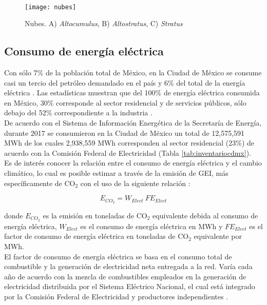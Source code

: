 \\

\begin{figure}[htb]
  \centering
    \texttt{[image: nubes]}
  \caption{Nubes. A) \textit{Altocumulus}, B) \textit{Altostratus}, C) \textit{Stratus} \citep{Metoffice2019}}
  \label{nubes}
\end{figure}

\newpage

\subsection{Consumo de energía eléctrica}
\label{subsec:consumoenergiaelectrica}

Con sólo 7\% de la población total de México, en la Ciudad de México se consume casi un tercio del petróleo demandado en el país y 6\% del total de la energía eléctrica \citep{SENER2013}. Las estadísticas muestran que del 100\% de energía eléctrica consumida en México, 30\% corresponde al sector residencial y de servicios públicos, sólo debajo del 52\% correspondiente a la industria \citep{Ramos2012}.\\

De acuerdo con el Sistema de Información Energética de la Secretaría de Energía, durante 2017 se consumieron en la Ciudad de México un total de 12,575,591 MWh de los cuales 2,938,559 MWh corresponden al sector residencial (23\%) de acuerdo con la Comisión Federal de Electricidad (Tabla \ref{tab:inventariocdmx}).\\

Es de interés conocer la relación entre el consumo de energía eléctrica y el cambio climático, lo cual es posible estimar a través de la emisión de GEI, más específicamente de CO$_{2}$ con el uso de la siguiente relación \citep{UTSEDEMA2018}: 

\begin{equation}
E_{CO_{2}} = W_{Elect}\: FE_{Elect}
\end{equation}

donde $E_{CO_{2}}$ es la emisión en toneladas de CO$_{2}$ equivalente debida al consumo de energía eléctrica, $W_{Elect}$ es el consumo de energía eléctrica en MWh y $FE_{Elect}$ es el factor de consumo de energía eléctrica en toneladas de CO$_{2}$ equivalente por MWh.\\

El factor de consumo de energía eléctrica se basa en el consumo total de combustible y la generación de electricidad neta entregada a la red. Varía cada año de acuerdo con la mezcla de combustibles empleados en la generación de electricidad distribuida por el Sistema Eléctrico Nacional, el cual está integrado por la Comisión Federal de Electricidad y productores independientes \citep{GEI2013}.\\

